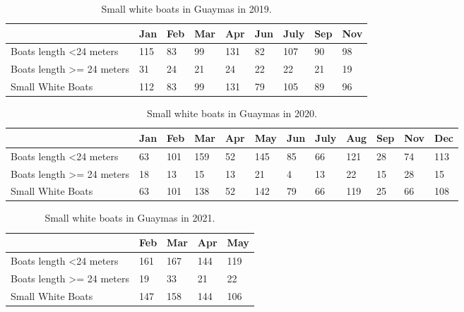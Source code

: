 \begin{table}[h!]
\begin{tabular}{|l|l|l|l|l|l|l|l|l|}
\hline
                                       & Jan & Feb & Mar & Apr & Jun & July & Sep & Nov \\ \hline
Boats length \textless 24 meters       & 115 & 83  & 99  & 131 & 82  & 107  & 90  & 98  \\ \hline
Boats length \textgreater{}= 24 meters & 31  & 24  & 21  & 24  & 22  & 22   & 21  & 19  \\ \hline
Small White Boats                      & 112 & 83  & 99  & 131 & 79  & 105  & 89  & 96  \\ \hline
\end{tabular}
\caption{Small white boats in Guaymas in 2019.}
\end{table}


\begin{table}[h!]
\begin{tabular}{|l|l|l|l|l|l|l|l|l|l|l|l|}
\hline
                                       & Jan & Feb & Mar & Apr & May & Jun & July & Aug & Sep & Nov & Dec \\ \hline
Boats length \textless 24 meters       & 63  & 101 & 159 & 52  & 145 & 85  & 66   & 121 & 28  & 74  & 113 \\ \hline
Boats length \textgreater{}= 24 meters & 18  & 13  & 15  & 13  & 21  & 4   & 13   & 22  & 15  & 28  & 15  \\ \hline
Small White Boats                      & 63  & 101 & 138 & 52  & 142 & 79  & 66   & 119 & 25  & 66  & 108 \\ \hline
\end{tabular}
\caption{Small white boats in Guaymas in 2020.}
\end{table}



\begin{table}[h!]
\begin{tabular}{|l|l|l|l|l|}
\hline
                                       & Feb & Mar & Apr & May \\ \hline
Boats length \textless 24 meters       & 161 & 167 & 144 & 119 \\ \hline
Boats length \textgreater{}= 24 meters & 19  & 33  & 21  & 22  \\ \hline
Small White Boats                      & 147 & 158 & 144 & 106 \\ \hline
\end{tabular}
\caption{Small white boats in Guaymas in 2021.}
\end{table}


